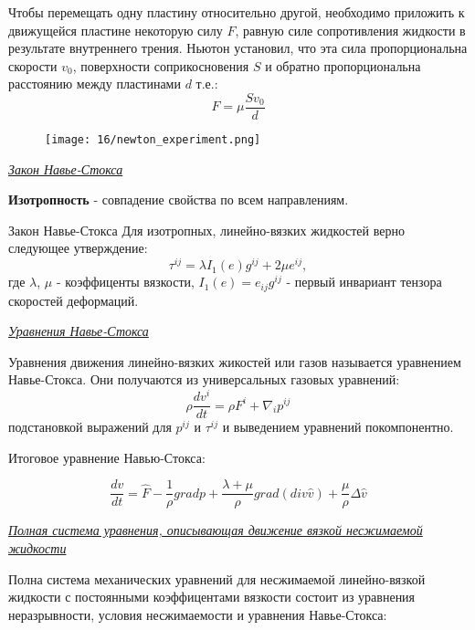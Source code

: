 Чтобы перемещать одну пластину относительно другой, необходимо приложить к движущейся пластине некоторую силу $F$, равную силе сопротивления жидкости в результате внутреннего трения. Ньютон установил, что эта сила пропорциональна скорости $v_0$, поверхности соприкосновения $S$ и обратно пропорциональна расстоянию между пластинами $d$ т.е.:
$$F = \mu\frac{S v_0}{d}$$

\begin{figure}[H]
  \texttt{[image: 16/newton\_experiment.png]}
\end{figure}


\begin{center}
  \textit{\underline{Закон Навье-Стокса}}
\end{center}


\begin{defn}
  \textbf{Изотропность} - совпадение свойства по всем направлениям.
\end{defn}

\begin{theorem}[Э-132]Закон Навье-Стокса
  Для изотропных, линейно-вязких жидкостей верно следующее утверждение:
  $$\tau^{ij} = \lambda I_1(e)g^{ij}+2\mu e^{ij},$$ где $\lambda$, $\mu$ - коэффиценты вязкости, $I_1(e) = e_{ij}g^{ij}$ - первый инвариант тензора скоростей деформаций.
\end{theorem}


\begin{center}
  \textit{\underline{Уравнения Навье-Стокса}}
\end{center}

Уравнения движения линейно-вязких жикостей или газов называется уравнением Навье-Стокса. Они получаются из универсальных газовых уравнений: $$\rho\frac{dv^i}{dt} = \rho F^i + \nabla_{i}p^{ij}$$ подстановкой выражений для $p^{ij}$ и $\tau^{ij}$ и выведением уравнений покомпонентно.

Итоговое уравнение Навью-Стокса:

$$\frac{dv}{dt} = \hat{F} - \frac{1}{\rho}grad p + \frac{\lambda + \mu}{\rho}grad(div \hat{v}) + \frac{\mu}{\rho}\Delta \hat{v}$$


\begin{center}
  \textit{\underline{Полная система уравнения, описывающая движение вязкой несжимаемой жидкости}}
\end{center}


Полна система механических уравнений для несжимаемой линейно-вязкой жидкости с постоянными коэффицентами вязкости состоит из уравнения неразрывности, условия несжимаемости и уравнения Навье-Стокса:

